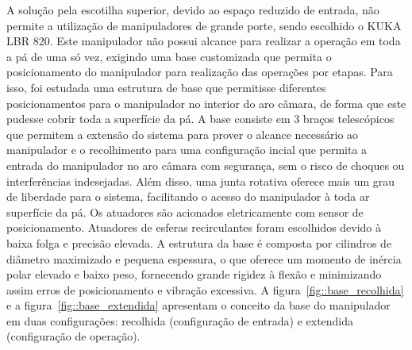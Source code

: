 A solução pela escotilha superior, devido ao espaço reduzido de entrada, não
permite a utilização de manipuladores de grande porte, sendo escolhido o KUKA
LBR 820. Este manipulador não possui alcance para realizar a operação em toda a
pá de uma só vez, exigindo uma base customizada que permita o
posicionamento do manipulador para realização das operações por etapas. Para
isso, foi estudada uma estrutura de base que permitisse diferentes
posicionamentos para o manipulador no interior do aro câmara, de forma que este
pudesse cobrir toda a superfície da pá. A base consiste em 3 braços
telescópicos que permitem a extensão do sistema para prover o alcance
necessário ao manipulador e o recolhimento para uma configuração incial que
permita a entrada do manipulador no aro câmara com segurança, sem o risco de
choques ou interferências indesejadas. Além disso, uma junta rotativa oferece mais um grau
de liberdade para o sistema, facilitando o acesso do manipulador à toda ar
superfície da pá. Os atuadores são acionados eletricamente com sensor de
posicionamento. Atuadores de esferas recirculantes foram escolhidos devido à
baixa folga e precisão elevada. A estrutura da base é composta por cilindros de
diâmetro maximizado e pequena espessura, o que oferece um momento de inércia
polar elevado e baixo peso, fornecendo grande rigidez à flexão e minimizando
assim erros de posicionamento e vibração excessiva. A
figura~\ref{fig::base_recolhida} e a figura~\ref{fig::base_extendida} apresentam
o conceito da base do manipulador em duas configurações: recolhida (configuração
de entrada) e extendida (configuração de operação).
